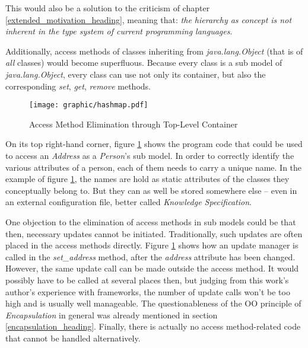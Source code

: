 This would also be a solution to the criticism of chapter
\ref{extended_motivation_heading}, meaning that: \textit{the hierarchy as
concept is not inherent in the type system of current programming languages}.

Additionally, access methods of classes inheriting from \emph{java.lang.Object}
(that is of \emph{all} classes) would become superfluous. Because every class
is a sub model of \emph{java.lang.Object}, every class can use not only its
container, but also the corresponding \emph{set}, \emph{get}, \emph{remove}
methods.

\begin{figure}[ht]
    \begin{center}
        \texttt{[image: graphic/hashmap.pdf]}
        \caption{Access Method Elimination through Top-Level Container}
        \label{hashmap_figure}
    \end{center}
\end{figure}

On its top right-hand corner, figure \ref{hashmap_figure} shows the program code
that could be used to access an \emph{Address} as a \emph{Person}'s sub model.
In order to correctly identify the various attributes of a person, each of them
needs to carry a unique name. In the example of figure \ref{hashmap_figure},
the names are hold as static attributes of the classes they conceptually belong
to. But they can as well be stored somewhere else -- even in an external
configuration file, better called \emph{Knowledge Specification}.

One objection to the elimination of access methods in sub models could be that
then, necessary updates cannot be initiated. Traditionally, such updates are
often placed in the access methods directly. Figure \ref{hashmap_figure} shows
how an update manager is called in the \emph{set\_address} method, after the
\emph{address} attribute has been changed. However, the same update call can be
made outside the access method. It would possibly have to be called at several
places then, but judging from this work's author's experience with frameworks,
the number of update calls won't be too high and is usually well manageable.
The questionableness of the OO principle of \emph{Encapsulation} in general was
already mentioned in section \ref{encapsulation_heading}. Finally, there is
actually no access method-related code that cannot be handled alternatively.
